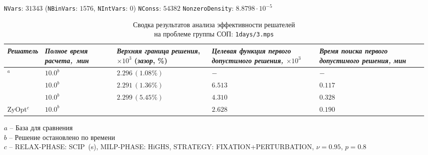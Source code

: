 \documentclass[%
	11pt,
	a4paper,
	utf8,
		]{article}
\begin{document}
\vspace*{5mm}

{
	\begin{table}[!h]
		\centering
		\caption{Сводка результатов анализа эффективности решателей\\ на проблеме группы СОП: \texttt{1days/3.mps}} 
		
		{\footnotesize \texttt{NVars}: $ 31 343 $ (\texttt{NBinVars}: $ 1576 $,  \texttt{NIntVars}: $ 0 $) \texttt{NConss}: $ 54 382 $ \texttt{NonzeroDensity}: $ 8.8798 \cdot 10^{-5} $}\\[2mm]
		
		\begin{tabular}{ p{2.9cm} | p{2.5cm} p{3.4cm} p{3.75cm} p{3.6cm} p{3.2cm} }
			\rowcolor{black!5}\emph{Решатель} & \emph{Полное время \mbox{расчета, мин}} & \emph{Верхняя граница} \mbox{\itshape решения}, $ \times 10^{3} $ (\emph{зазор}, \%) & \emph{Целевая функция первого допустимого решения, $ \times 10^3 $} & \emph{Время поиска первого допустимого решения, мин} \\
			\hline
			\rowcolor{blue!3}{CPLEX 12.8.0.0}$ ^a $ & $ 10.0^b $ & $ 2.296 \, (1.08\%) $ & $ - $ & $ - $ \\
			\rowcolor{black!5}{SCIP 8.0.3} & $ 10.0^b $ & $ 2.291\, (1.36\%) $ & $ 6.513 $ & $ 0.117 $ \\
			\rowcolor{blue!3}{HiGHS 1.5.3} & $ 10.0^b $ & $ 2.299 \, (5.45\%) $ & $ 4.310 $ & $ 0.328 $ \\
			\rowcolor{black!3}ZyOpt$^c$ & {$10.0 ^b $}  & \ccg{$ 2.291 \, (1.41\%) (+0.2\%) $} & $ 2.628 $ & $ 0.190 $ \\
		\end{tabular}
	\end{table}
	\vspace*{-3mm}
	\hspace*{3mm}$ a $ -- {\footnotesize База для сравнения}\\[-7mm]
	
	\hspace*{3mm}$ b $ -- {\footnotesize Решение остановлено по времени}\\[-7mm]
	
	\hspace*{3mm}$ c $ -- {\footnotesize RELAX-PHASE: SCIP~(s), MILP-PHASE: HiGHS, STRATEGY: FIXATION+PERTURBATION, $ \nu = 0.95 $, $ p = 0.8 $}\\[-7mm]
}
\end{document}
